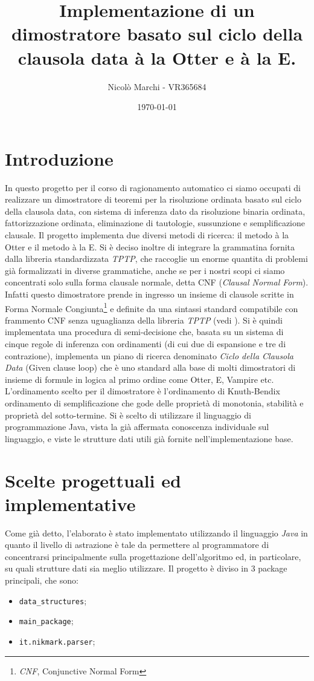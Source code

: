 \documentclass[a4paper,11pt]{article}
\title{\bf{Implementazione di un dimostratore basato sul ciclo della clausola data \`a la Otter e \`a la E.}}
\author{Nicolò Marchi - VR365684}
\date{\today}
\begin{document}
\maketitle

\section{Introduzione}
In questo progetto per il corso di ragionamento automatico ci siamo occupati di realizzare un dimostratore di teoremi per la risoluzione ordinata basato sul ciclo della clausola data, con sistema di inferenza dato da risoluzione binaria ordinata, fattorizzazione ordinata, eliminazione di tautologie, sussunzione e semplificazione clausale. Il progetto implementa due diversi metodi di ricerca: il metodo \`a la Otter e il metodo \`a la E. Si \`e deciso inoltre di integrare la grammatina fornita dalla libreria standardizzata \emph{TPTP}\cite{TPTP}\cite{TPTPsyntax}, che raccoglie un enorme quantita di problemi già formalizzati in diverse grammatiche, anche se per i nostri scopi ci siamo concentrati solo sulla forma clausale normale, detta CNF (\emph{Clausal Normal Form}).
Infatti questo dimostratore prende in ingresso un insieme di clausole scritte in Forma Normale Congiunta\footnote{\emph{CNF}, Conjunctive Normal Form} e definite da una sintassi standard compatibile con frammento CNF senza uguaglianza della libreria \emph{TPTP} (vedi \cite{TPTP}). Si è quindi implementata una procedura di semi-decisione che, basata su un sistema di cinque regole di inferenza con ordinamenti (di cui due di espansione e tre di contrazione), implementa un piano di ricerca denominato \emph{Ciclo della Clausola Data} (Given clause loop) che è uno standard alla base di molti dimostratori di insieme di formule in logica al primo ordine come Otter, E, Vampire etc. L'ordinamento scelto per il dimostratore è l'ordinamento di Knuth-Bendix  ordinamento di semplificazione che gode delle proprietà di monotonia, stabilità e proprietà del sotto-termine. Si è scelto di utilizzare il linguaggio di programmazione Java, vista la già affermata conoscenza individuale sul linguaggio, e viste le strutture dati utili già fornite nell'implementazione base.

\section{Scelte progettuali ed implementative}
Come già detto, l'elaborato è stato implementato utilizzando il linguaggio \emph{Java} in quanto il livello di astrazione è tale da permettere al programmatore di concentrarsi principalmente sulla progettazione dell'algoritmo ed, in particolare, su quali strutture dati sia meglio utilizzare. Il progetto è diviso in 3 package principali, che sono:
\begin{itemize}
\item \texttt{data\_structures};
\item \texttt{main\_package};
\item \texttt{it.nikmark.parser};
\end{itemize} 
\end{document}
